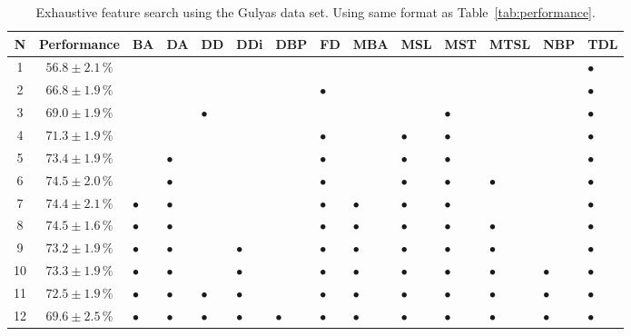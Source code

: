 \documentclass[11pt]{article}
\begin{document}
\clearpage

% 

%

\begin{table}
\begin{tabular}{ccllllllllllll}
N & Performance  & BA & DA & DD & DDi & DBP & FD & MBA & MSL & MST & MTSL & NBP & TDL\\
\toprule
1 & $56.8 \pm 2.1\,\%$  &  &  &  &  &  &  &  &  &  &  &  & $\bullet$\\
2 & $66.8 \pm 1.9\,\%$  &  &  &  &  &  & $\bullet$ &  &  &  &  &  & $\bullet$\\
3 & $69.0 \pm 1.9\,\%$  &  &  & $\bullet$ &  &  &  &  &  & $\bullet$ &  &  & $\bullet$\\
4 & $71.3 \pm 1.9\,\%$  &  &  &  &  &  & $\bullet$ &  & $\bullet$ & $\bullet$ &  &  & $\bullet$\\
5 & $73.4 \pm 1.9\,\%$  &  & $\bullet$ &  &  &  & $\bullet$ &  & $\bullet$ & $\bullet$ &  &  & $\bullet$\\
6 & $74.5 \pm 2.0\,\%$  &  & $\bullet$ &  &  &  & $\bullet$ &  & $\bullet$ & $\bullet$ & $\bullet$ &  & $\bullet$\\
7 & $74.4 \pm 2.1\,\%$  & $\bullet$ & $\bullet$ &  &  &  & $\bullet$ & $\bullet$ & $\bullet$ & $\bullet$ &  &  & $\bullet$\\
8 & $74.5 \pm 1.6\,\%$  & $\bullet$ & $\bullet$ &  &  &  & $\bullet$ & $\bullet$ & $\bullet$ & $\bullet$ & $\bullet$ &  & $\bullet$\\
9 & $73.2 \pm 1.9\,\%$  & $\bullet$ & $\bullet$ &  & $\bullet$ &  & $\bullet$ & $\bullet$ & $\bullet$ & $\bullet$ & $\bullet$ &  & $\bullet$\\
10 & $73.3 \pm 1.9\,\%$  & $\bullet$ & $\bullet$ &  & $\bullet$ &  & $\bullet$ & $\bullet$ & $\bullet$ & $\bullet$ & $\bullet$ & $\bullet$ & $\bullet$\\
11 & $72.5 \pm 1.9\,\%$  & $\bullet$ & $\bullet$ & $\bullet$ & $\bullet$ &  & $\bullet$ & $\bullet$ & $\bullet$ & $\bullet$ & $\bullet$ & $\bullet$ & $\bullet$\\
12 & $69.6 \pm 2.5\,\%$  & $\bullet$ & $\bullet$ & $\bullet$ & $\bullet$ & $\bullet$ & $\bullet$ & $\bullet$ & $\bullet$ & $\bullet$ & $\bullet$ & $\bullet$ & $\bullet$\\
\bottomrule
\end{tabular}
\caption{Exhaustive feature search using the Gulyas data set.  Using same format
  as Table~\ref{tab:performance}. }
\end{table}
\end{document}
